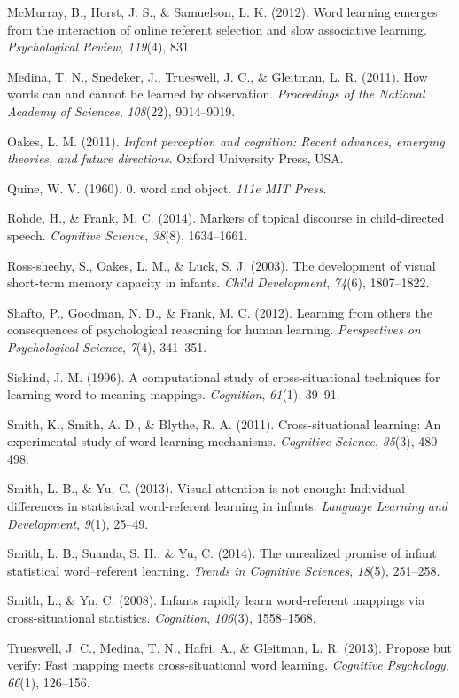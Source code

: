 \documentclass[12pt,]{article}
\begin{document}
McMurray, B., Horst, J. S., \& Samuelson, L. K. (2012). Word learning
emerges from the interaction of online referent selection and slow
associative learning. \emph{Psychological Review}, \emph{119}(4), 831.

Medina, T. N., Snedeker, J., Trueswell, J. C., \& Gleitman, L. R.
(2011). How words can and cannot be learned by observation.
\emph{Proceedings of the National Academy of Sciences}, \emph{108}(22),
9014--9019.

Oakes, L. M. (2011). \emph{Infant perception and cognition: Recent
advances, emerging theories, and future directions}. Oxford University
Press, USA.

Quine, W. V. (1960). 0. word and object. \emph{111e MIT Press}.

Rohde, H., \& Frank, M. C. (2014). Markers of topical discourse in
child-directed speech. \emph{Cognitive Science}, \emph{38}(8),
1634--1661.

Ross-sheehy, S., Oakes, L. M., \& Luck, S. J. (2003). The development of
visual short-term memory capacity in infants. \emph{Child Development},
\emph{74}(6), 1807--1822.

Shafto, P., Goodman, N. D., \& Frank, M. C. (2012). Learning from others
the consequences of psychological reasoning for human learning.
\emph{Perspectives on Psychological Science}, \emph{7}(4), 341--351.

Siskind, J. M. (1996). A computational study of cross-situational
techniques for learning word-to-meaning mappings. \emph{Cognition},
\emph{61}(1), 39--91.

Smith, K., Smith, A. D., \& Blythe, R. A. (2011). Cross-situational
learning: An experimental study of word-learning mechanisms.
\emph{Cognitive Science}, \emph{35}(3), 480--498.

Smith, L. B., \& Yu, C. (2013). Visual attention is not enough:
Individual differences in statistical word-referent learning in infants.
\emph{Language Learning and Development}, \emph{9}(1), 25--49.

Smith, L. B., Suanda, S. H., \& Yu, C. (2014). The unrealized promise of
infant statistical word--referent learning. \emph{Trends in Cognitive
Sciences}, \emph{18}(5), 251--258.

Smith, L., \& Yu, C. (2008). Infants rapidly learn word-referent
mappings via cross-situational statistics. \emph{Cognition},
\emph{106}(3), 1558--1568.

Trueswell, J. C., Medina, T. N., Hafri, A., \& Gleitman, L. R. (2013).
Propose but verify: Fast mapping meets cross-situational word learning.
\emph{Cognitive Psychology}, \emph{66}(1), 126--156.
\end{document}
